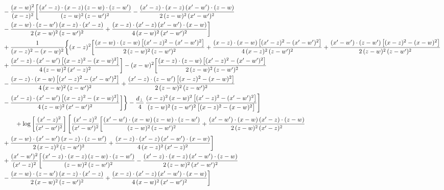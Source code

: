 \documentclass[10pt]{article}
\begin{document}
\begin{align}
&-\frac{(x-w)^{2}}{(x-z)^{2}}\bigg[\frac{(x^{\prime}-z)\cdot(x-z)\,(z-w)\cdot(z-w^{\prime})}{(z-w)^{2}\,(z-w^{\prime})^{2}}-\frac{(x^{\prime}-z)\cdot(x-z)\,(x^{\prime}-w^{\prime})\cdot(z-w)}{2\,(z-w)^{2}\,(x^{\prime}-w^{\prime})^{2}}\notag \\ & -\frac{(x-w)\cdot(z-w^{\prime})\,(x-z)\cdot(x^{\prime}-z)}{2\,(x-w)^{2}\,(z-w^{\prime})^{2}}+\frac{(x-z)\cdot(x^{\prime}-z)\,(x^{\prime}-w^{\prime})\cdot(x-w)}{4\,(x-w)^{2}\,(x^{\prime}-w^{\prime})^{2}}\bigg]\notag\\
&+\frac{1}{(x-z)^{2}-(x-w)^{2}}\bigg\{(x-z)^{2}\bigg[\frac{(x-w)\cdot(z-w)\,\big[(x^{\prime}-z)^{2}-(x^{\prime}-w^{\prime})^{2}\big]}{2\,(z-w)^{2}\,(z-w^{\prime})^{2}}+\frac{(x-z)\cdot(x-w)\,\big[(x^{\prime}-z)^{2}-(x^{\prime}-w^{\prime})^{2}\big]}{4\,(x-z)^{2}\,(z-w^{\prime})^{2}}+\frac{(x^{\prime}-w^{\prime})\cdot(z-w^{\prime})\,\big[(x-z)^{2}-(x-w)^{2}\big]}{2\,(z-w)^{2}\,(z-w^{\prime})^{2}}\notag \\ & +\frac{(x^{\prime}-z)\cdot(x^{\prime}-w^{\prime})\,\big[(x-z)^{2}-(x-w)^{2}\big]}{4\,(z-w)^{2}\,(x^{\prime}-z)^{2}}\bigg]-(x-w)^{2}\bigg[\frac{(x-z)\cdot(z-w)\,\big[(x^{\prime}-z)^{2}-(x^{\prime}-w^{\prime})^{2}\big]}{2\,(z-w)^{2}\,(z-w^{\prime})^{2}}\notag \\ & -\frac{(x-z)\cdot(x-w)\,\big[(x^{\prime}-z)^{2}-(x^{\prime}-w^{\prime})^{2}\big]}{4\,(x-w)^{2}\,(z-w^{\prime})^{2}}+\frac{(x^{\prime}-z)\cdot(z-w^{\prime})\,\big[(x-z)^{2}-(x-w)^{2}\big]}{2\,(z-w)^{2}\,(z-w^{\prime})^{2}}\notag \\ & -\frac{(x^{\prime}-z)\cdot(x^{\prime}-w^{\prime})\,\big[(x-z)^{2}-(x-w)^{2}\big]}{4\,(z-w)^{2}\,(x^{\prime}-w^{\prime})^{2}}\bigg]\bigg\}-\frac{d_{\perp}}{4}\,\frac{(x-z)^{2}\,(x-w)^{2}\,\big[(x^{\prime}-z)^{2}-(x^{\prime}-w^{\prime})^{2}\big]}{(z-w)^{2}\,(z-w^{\prime})^{2}\,\big[(x-z)^{2}-(x-w)^{2}\big]}\Bigg]\notag\\
&\qquad+\log\left[\frac{(x^{\prime}-z)^{2}}{(x^{\prime}-w^{\prime})^{2}}\right]\Bigg[\frac{(x^{\prime}-z)^{2}}{(x^{\prime}-w^{\prime})^{2}}\bigg[\frac{(x^{\prime}-w^{\prime})\cdot(x-w)\,(z-w)\cdot(z-w^{\prime})}{(z-w)^{2}\,(z-w^{\prime})^{2}}+\frac{(x^{\prime}-w^{\prime})\cdot(x-w)\,(x^{\prime}-z)\cdot(z-w)}{2\,(z-w)^{2}\,(x^{\prime}-z)^{2}}\notag \\ & +\frac{(x-w)\cdot(x^{\prime}-w^{\prime})\,(x-z)\cdot(z-w^{\prime})}{2\,(x-z)^{2}\,(z-w^{\prime})^{2}}+\frac{(x-z)\cdot(x^{\prime}-z)\,(x^{\prime}-w^{\prime})\cdot(x-w)}{4\,(x-z)^{2}\,(x^{\prime}-z)^{2}}\bigg]\notag\\
&+\frac{(x^{\prime}-w^{\prime})^{2}}{(x^{\prime}-z)^{2}}\bigg[\frac{(x^{\prime}-z)\cdot(x-z)\,(z-w)\cdot(z-w^{\prime})}{(z-w)^{2}\,(z-w^{\prime})^{2}}-\frac{(x^{\prime}-z)\cdot(x-z)\,(x^{\prime}-w^{\prime})\cdot(z-w)}{2\,(z-w)^{2}\,(x^{\prime}-w^{\prime})^{2}}\notag \\ & -\frac{(x-w)\cdot(z-w^{\prime})\,(x-z)\cdot(x^{\prime}-z)}{2\,(x-w)^{2}\,(z-w^{\prime})^{2}}+\frac{(x-z)\cdot(x^{\prime}-z)\,(x^{\prime}-w^{\prime})\cdot(x-w)}{4\,(x-w)^{2}\,(x^{\prime}-w^{\prime})^{2}}\bigg]\notag\\

\end{align}
\end{document}
